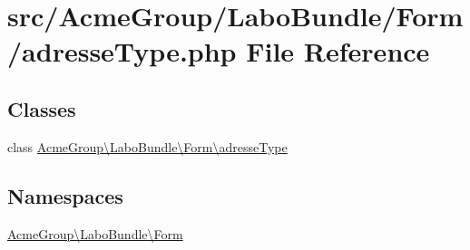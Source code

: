 \hypertarget{adresse_type_8php}{\section{src/\+Acme\+Group/\+Labo\+Bundle/\+Form/adresse\+Type.php File Reference}
\label{adresse_type_8php}
}
\subsection*{Classes}
\begin{DoxyCompactItemize}
\item 
class \hyperlink{class_acme_group_1_1_labo_bundle_1_1_form_1_1adresse_type}{Acme\+Group\textbackslash{}\+Labo\+Bundle\textbackslash{}\+Form\textbackslash{}adresse\+Type}
\end{DoxyCompactItemize}
\subsection*{Namespaces}
\begin{DoxyCompactItemize}
\item 
 \hyperlink{namespace_acme_group_1_1_labo_bundle_1_1_form}{Acme\+Group\textbackslash{}\+Labo\+Bundle\textbackslash{}\+Form}
\end{DoxyCompactItemize}
